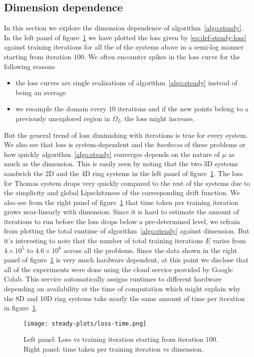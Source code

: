 \subsection{Dimension dependence} In this section we explore the dimension dependence of algorithm~\ref{algo:steady}.
In the left panel of figure~\ref{fig:time-loss} we have plotted the loss given by \eqref{eq:def-steady-loss} against training iterations for all the of the systems above in a semi-log manner starting from iteration $100$. We often encounter spikes in the loss curve for the following reasons
\begin{itemize}
    \item the loss curves are single realizations of algorithm~\ref{algo:steady} instead of being an average
    \item we resample the domain every $10$ iterations and if the new points belong to a previously unexplored region in $\Omega_I$, the loss might increase.
\end{itemize}
But the general trend of loss diminishing with iterations is true for every system. We also see that loss is system-dependent and the \textit{hardness} of these problems or how quickly algorithm~\ref{algo:steady} converges depends on the nature of $\mu$ as much as the dimension. This is easily seen by noting that the two 3D systems sandwich the 2D and the 4D ring systems in the left panel of figure~\ref{fig:time-loss}. The loss for Thomas system drops very quickly compared to the rest of the systems due to the simplicity and global Lipschitzness of the corresponding drift function. We also see from the right panel of figure~\ref{fig:time-loss} that time taken per training iteration grows near-linearly with dimension. Since it is hard to estimate the amount of iterations to run before the loss drops below a pre-determined level, we refrain from plotting the total runtime of algorithm~\ref{algo:steady} against dimension. But it's interesting to note that the number of total training iterations $E$ varies from $4\times10^5$ to $4.6\times10^6$ across all the problems. Since the data shown in the right panel of figure~\ref{fig:time-loss} is very much hardware dependent, at this point we disclose that all of the experiments were done using the cloud service provided by Google Colab. This service automatically assigns runtimes to different hardware depending on availability at the time of computation which might explain why the 8D and 10D ring systems take nearly the same amount of time per iteration in figure~\ref{fig:time-loss}.
\begin{figure}[!ht]
    \centering\texttt{[image: steady-plots/loss-time.png]}
    \caption{Left panel: Loss vs training iteration starting from iteration $100$. Right panel: time taken per training iteration vs dimension.}
    \label{fig:time-loss}
\end{figure}

